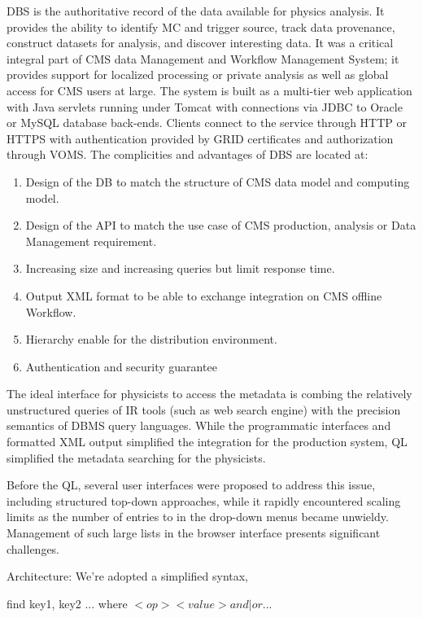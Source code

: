 DBS is the authoritative record of the data available for physics analysis. It provides the ability to identify MC and trigger source, track data provenance, construct datasets for analysis, and discover interesting data. It was a critical integral part of CMS data Management and Workflow Management System; it provides support for localized processing or private analysis as well as global access for CMS users at large.  The system is built as a multi-tier web application with Java servlets running under Tomcat with connections via JDBC to Oracle or MySQL database back-ends. Clients connect to the service through HTTP or HTTPS with authentication provided by GRID certificates and authorization through VOMS.
The complicities and advantages of DBS are located at:
\begin{enumerate}
\item Design of the DB to match the structure of CMS data model and computing model.
\item Design of the API to match the use case of CMS production, analysis or Data Management requirement.
\item Increasing size and increasing queries but limit response time.
\item Output XML format to be able to exchange integration on CMS offline Workflow.
\item Hierarchy enable for the distribution environment.
\item Authentication and security guarantee
\end{enumerate}

     The ideal interface for physicists to access the metadata is combing the relatively unstructured queries of IR tools (such as web search engine) with the precision semantics of DBMS query languages. While the programmatic interfaces and formatted XML output simplified the integration for the production system, QL simplified the metadata searching for the physicists.

     Before the QL, several user interfaces were proposed to address this issue, including structured top-down approaches, while it rapidly encountered scaling limits as the number of entries to in the drop-down menus became unwieldy. Management of such large lists in the browser interface presents significant challenges.

Architecture:
 We're adopted a simplified syntax,
\begin{center}
find key1, key2 ... where \(< key > < op > < value > and | or...\)
\end{center}

